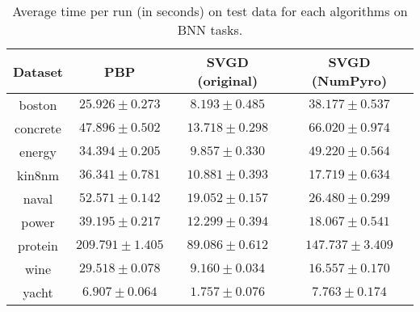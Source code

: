 \begin{table}[]
\centering
\caption{Average time per run (in seconds) on test data for each algorithms on BNN tasks.} 
\label{tab:bnn_time}
\begin{tabular}{|c|ccc|}
\hline
 Dataset & PBP & SVGD (original) & SVGD (NumPyro)  \\
 \hline
boston & $25.926 \pm 0.273$ & $8.193 \pm 0.485$ & $38.177 \pm 0.537$ \\
concrete & $47.896 \pm 0.502$ & $13.718 \pm 0.298$ & $66.020 \pm 0.974$ \\
energy & $34.394 \pm 0.205$ & $9.857 \pm 0.330$ & $49.220 \pm 0.564$ \\
kin8nm & $36.341 \pm 0.781$ & $10.881 \pm 0.393$ & $17.719 \pm 0.634$ \\
naval & $52.571 \pm 0.142$ & $19.052 \pm 0.157$ & $26.480 \pm 0.299$ \\
power & $39.195 \pm 0.217$ & $12.299 \pm 0.394$ & $18.067 \pm 0.541$ \\
protein & $209.791 \pm 1.405$ & $89.086 \pm 0.612$ & $147.737 \pm 3.409$ \\
wine & $29.518 \pm 0.078$ & $9.160 \pm 0.034$ & $16.557 \pm 0.170$ \\
yacht & $6.907 \pm 0.064$ & $1.757 \pm 0.076$ & $7.763 \pm 0.174$ \\
\hline
\end{tabular}
\end{table}